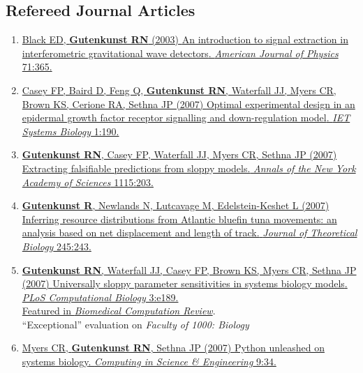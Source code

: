 \documentclass[11pt]{article}
\begin{document}
\subsection*{Refereed Journal Articles}
\begin{enumerate}


\item \href{http://doi.org/10.1119/1.1531578}{Black ED, \textbf{Gutenkunst RN} (2003) {An introduction to signal extraction in
  interferometric gravitational wave detectors}.
\newblock \emph{American Journal of Physics} 71:365.}

\item \href{http://doi.org/10.1049/iet-syb:20060065}{\grad Casey FP\corresponding, Baird D, Feng Q, \textbf{Gutenkunst RN}, Waterfall JJ, Myers CR, Brown KS, Cerione RA, Sethna JP (2007) {Optimal experimental design in an epidermal growth factor receptor signalling and down-regulation model}.
\newblock \emph{IET Systems Biology} 1:190.}

\item \href{http://doi.org/10.1196/annals.1407.003}{\grad \textbf{Gutenkunst RN}\corresponding, Casey FP, Waterfall JJ, Myers CR, Sethna JP (2007)
  {Extracting falsifiable predictions from sloppy models.}
\newblock \emph{Annals of the New York Academy of Sciences} 1115:203.}

\item \href{http://doi.org/10.1016/j.jtbi.2006.10.014}{\grad \textbf{Gutenkunst R}\corresponding, Newlands N, Lutcavage M, Edelstein-Keshet L (2007)
  {Inferring resource distributions from Atlantic bluefin tuna movements: an
  analysis based on net displacement and length of track.}
\newblock \emph{Journal of Theoretical Biology} 245:243.}

\item \href{http://doi.org/10.1371/journal.pcbi.0030189}{\grad \textbf{Gutenkunst RN}\corresponding, Waterfall JJ, Casey FP, Brown KS, Myers CR, Sethna JP  (2007) {Universally sloppy parameter sensitivities in systems biology models}.
\newblock \emph{PLoS Computational Biology} 3:e189.}\\
  \href{http://biomedicalcomputationreview.org/content/%E2%80%9Csloppy%E2%80%9D-systems-biology}{Featured in \emph{Biomedical Computation Review}}.\\
 ``Exceptional'' evaluation on \textit{Faculty of 1000: Biology}

\item \href{http://doi.org/10.1109/MCSE.2007.60}{\grad Myers CR, \textbf{Gutenkunst RN}, Sethna JP (2007) {Python unleashed on systems
  biology}.
\newblock \emph{Computing in Science \& Engineering} 9:34.}



\end{enumerate}
\end{document}
